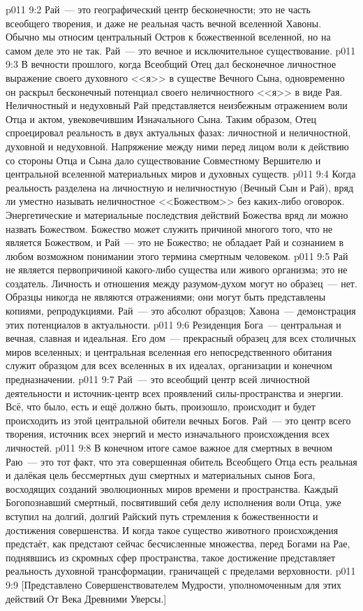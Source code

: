 \vs p011 9:2 \pc Рай~--- это географический центр бесконечности; это не часть всеобщего творения, и даже не реальная часть вечной вселенной Хавоны. Обычно мы относим центральный Остров к божественной вселенной, но на самом деле это не так. Рай~--- это вечное и исключительное существование.
\vs p011 9:3 \pc В вечности прошлого, когда Всеобщий Отец дал бесконечное личностное выражение своего духовного <<я>> в существе Вечного Сына, одновременно он раскрыл бесконечный потенциал своего неличностного <<я>> в виде Рая. Неличностный и недуховный Рай представляется неизбежным отражением воли Отца и актом, увековечившим Изначального Сына. Таким образом, Отец спроецировал реальность в двух актуальных фазах: личностной и неличностной, духовной и недуховной. Напряжение между ними перед лицом воли к действию со стороны Отца и Сына дало существование Совместному Вершителю и центральной вселенной материальных миров и духовных существ.
\vs p011 9:4 Когда реальность разделена на личностную и неличностную (Вечный Сын и Рай), вряд ли уместно называть неличностное <<Божеством>> без каких\hyp{}либо оговорок. Энергетические и материальные последствия действий Божества вряд ли можно назвать Божеством. Божество может служить причиной многого того, что не является Божеством, и Рай~--- это не Божество; не обладает Рай и сознанием в любом возможном понимании этого термина смертным человеком.
\vs p011 9:5 \pc Рай не является первопричиной какого\hyp{}либо существа или живого организма; это не создатель. Личность и отношения между разумом\hyp{}духом могут  но образец~--- нет. Образцы никогда не являются отражениями; они могут быть представлены копиями, репродукциями. Рай~--- это абсолют образцов; Хавона~--- демонстрация этих потенциалов в актуальности.
\vs p011 9:6 \pc Резиденция Бога~--- центральная и вечная, славная и идеальная. Его дом~--- прекрасный образец для всех столичных миров вселенных; и центральная вселенная его непосредственного обитания служит образцом для всех вселенных в их идеалах, организации и конечном предназначении.
\vs p011 9:7 Рай~--- это всеобщий центр всей личностной деятельности и источник\hyp{}центр всех проявлений силы\hyp{}пространства и энергии. Всё, что было, есть и ещё должно быть, произошло, происходит и будет происходить из этой центральной обители вечных Богов. Рай~--- это центр всего творения, источник всех энергий и место изначального происхождения всех личностей.
\vs p011 9:8 \pc В конечном итоге самое важное для смертных в вечном Раю~--- это тот факт, что эта совершенная обитель Всеобщего Отца есть реальная и далёкая цель бессмертных душ смертных и материальных сынов Бога, восходящих созданий эволюционных миров времени и пространства. Каждый Богопознавший смертный, посвятивший себя делу исполнения воли Отца, уже вступил на долгий, долгий Райский путь стремления к божественности и достижения совершенства. И когда такое существо животного происхождения предстаёт, как предстают сейчас бесчисленные множества, перед Богами на Рае, поднявшись из скромных сфер пространства, такое достижение представляет реальность духовной трансформации, граничащей с пределами верховности.
\vsetoff
\vs p011 9:9 [Представлено Совершенствователем Мудрости, уполномоченным для этих действий От Века Древними Уверсы.]
\quizlink
